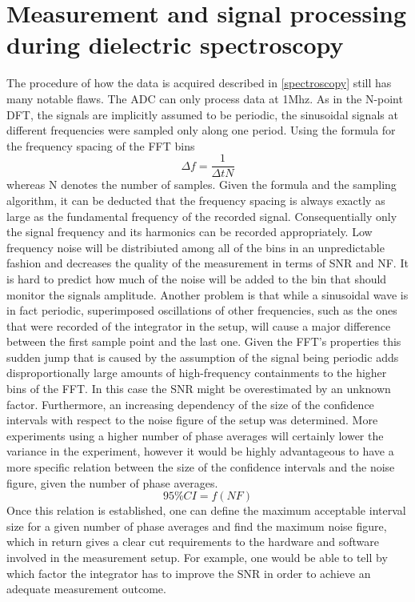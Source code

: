 \section{Measurement and signal processing during dielectric spectroscopy}
The procedure of how the data is acquired described in \ref{spectroscopy}
still has many notable flaws. The ADC can only process data at
1Mhz. As in the N-point DFT, the signals are implicitly assumed to be periodic,
the sinusoidal signals at different frequencies were sampled only along one period.
Using the formula for the frequency spacing of the FFT bins
\begin{equation}
 \Delta f=\frac{1}{\Delta t N}
\end{equation}
whereas N denotes the number of samples. 
Given the formula and the sampling algorithm, it can be deducted that the frequency spacing is
always exactly as large as the fundamental frequency of the recorded signal.
Consequentially only the signal frequency and its harmonics can be recorded appropriately.
Low frequency noise will be distribiuted among all of the bins in an unpredictable fashion and decreases
the quality of the measurement in terms of SNR and NF. It is hard to predict how much of the noise will be added to the bin that should
monitor the signals amplitude. 
Another problem is that while a sinusoidal wave is in fact periodic, superimposed oscillations of other frequencies, such as the ones that
were recorded of the integrator in the setup, will cause a major difference between the first sample point and the last one. 
Given the FFT's properties this sudden jump that is caused by the assumption of the signal being periodic adds
disproportionally large amounts of high-frequency containments to the higher bins of the FFT. In this case the SNR might be overestimated by an unknown factor. 
\newline
Furthermore, an increasing dependency of the size of the confidence intervals with respect to the noise figure of
the setup was determined. 
More experiments using a higher number of phase averages will certainly lower the variance in the experiment, however it would 
be highly advantageous to have a more specific relation between the size of the confidence intervals
and the noise figure, given the number of phase averages.
\begin{equation}
 95 \% CI=f\left(NF\right)
\end{equation}
Once this relation is established, one can define the maximum acceptable
interval size for a given number of phase averages and find the maximum noise figure, 
which in return gives a clear cut requirements to the hardware and software involved in the measurement setup.
For example, one would be able to tell by which factor the integrator has to improve the SNR in order to achieve
an adequate measurement outcome.


